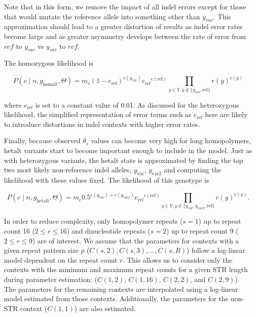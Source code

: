 \documentclass{article}
\begin{document}
Note that in this form, we remove the impact of all indel errors except for those that would mutate the reference allele into something other than $y_{var}$. This approximation should lead to a greater distortion of results as indel error rates become large and as greater asymmetry develops between the rate of error from $ref$ to $y_{var}$ vs $y_{var}$ to $ref$.

The homozygous likelihood is

\begin{equation*}
P (c \mid n, g_{\text{homalt}}, \Theta) = m_c (1-e_{\text{ref}})^{c(y_{\text{var}})} {e_{\text{ref}}}^{c(\text{ref})} \prod_{y \in Y, y \not\in \{y_{\text{var}},\text{ref}\}} r(y)^{c(y)}
\end{equation*}

where $e_{\text{ref}}$ is set to a constant value of 0.01. As discussed for the heterozygous likelihood, the simplified representation of error terms such as $e_{\text{ref}}$ here are likely to introduce distortions in indel contexts with higher error rates.

Finally, because observed $\theta_s$ values can become very high for long homopolymers, hetalt variants start to become important enough to include in the model. Just as with heterozygous variants, the hetalt state is approximated by finding the top two most likely non-reference indel alleles, $y_{\text{var}}$, $y_{\text{var2}}$ and computing the likelihood with these values fixed. The likelihood of this genotype is

\begin{equation*}
P (c \mid n, g_{\text{hetalt}}, \Theta) = m_c 0.5^{c(y_{\text{var}})+c(y_{\text{var2}})} {e_{\text{ref}}}^{c(\text{ref})} \prod_{y \in Y, y \not\in \{y_{\text{var}},y_{\text{var2}},\text{ref}\}} r(y)^{c(y)}.
\end{equation*}

In order to reduce complexity, only homopolymer repeats ($s=1$) up to repeat count 16 ($2\leq r \leq 16$) and dinucleotide repeats ($s=2$) up to repeat count 9 ($2\leq r \leq 9$) are of interest. We assume that the parameters for contexts with a given repeat pattern size $p$ ($C(s,2),C(s,3),...,C(s,R)$) follow a log-linear model dependent on the repeat count $r$. This allows us to consider only the contexts with the minimum and maximum repeat counts for a given STR length during parameter estimation: ($C(1,2)$, $C(1,16)$, $C(2,2)$, and $C(2,9)$). The parameters for the remaining contexts are interpolated using a log-linear model estimated from those contexts. Additionally, the parameters for the non-STR context ($C(1,1)$) are also estimated.
\end{document}

